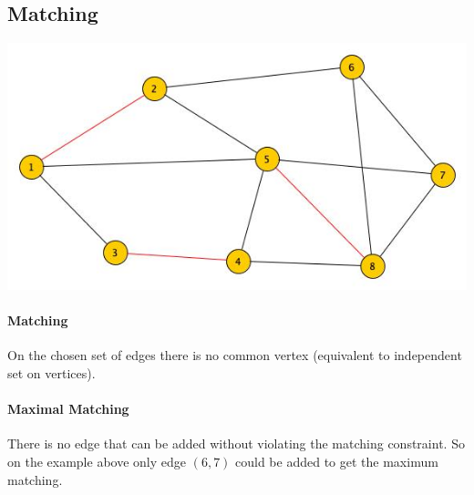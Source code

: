 \subsection{Matching}
\begin{center}
	\includegraphics[scale=0.5]{img/graph16}
\end{center}
\paragraph{Matching} On the chosen set of edges there is no common vertex (equivalent to independent set on vertices).
\paragraph{Maximal Matching} There is no edge that can be added without violating the matching constraint. So on the example above only edge $(6,7)$ could be added to get the maximum matching. 
